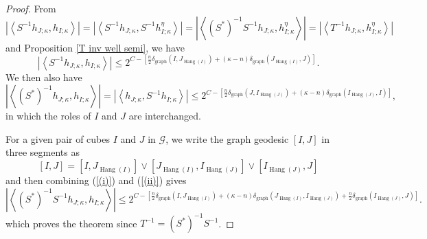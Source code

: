\documentclass{amsart}%
\theoremstyle{plain}
\numberwithin{equation}{section}
\begin{document}
\begin{proof}
From
\[
\left\vert \left\langle S^{-1}h_{J;\kappa},h_{I;\kappa}\right\rangle
\right\vert =\left\vert \left\langle S^{-1}h_{J;\kappa},S^{-1}h_{I;\kappa
}^{\eta}\right\rangle \right\vert =\left\vert \left\langle \left(  S^{\ast
}\right)  ^{-1}S^{-1}h_{J;\kappa},h_{I;\kappa}^{\eta}\right\rangle \right\vert
=\left\vert \left\langle T^{-1}h_{J;\kappa},h_{I;\kappa}^{\eta}\right\rangle
\right\vert
\]
and Proposition \ref{T inv well semi}, we have%
\begin{equation}
\left\vert \left\langle S^{-1}h_{J;\kappa},h_{I;\kappa}\right\rangle
\right\vert \leq2^{C-\left[  \frac{n}{2}\delta_{\operatorname*{graph}}\left(
I,J_{\operatorname*{Hang}\left(  I\right)  }\right)  +\left(  \kappa-n\right)
\delta_{\operatorname*{graph}}\left(  J_{\operatorname*{Hang}\left(  I\right)
},J\right)  \right]  }.\label{(i)}%
\end{equation}
We then also have%
\begin{equation}
\left\vert \left\langle \left(  S^{\ast}\right)  ^{-1}h_{J;\kappa}%
,h_{I;\kappa}\right\rangle \right\vert =\left\vert \left\langle h_{J;\kappa
},S^{-1}h_{I;\kappa}\right\rangle \right\vert \leq2^{C-\left[  \frac{n}%
{2}\delta_{\operatorname*{graph}}\left(  J,I_{\operatorname*{Hang}\left(
J\right)  }\right)  +\left(  \kappa-n\right)  \delta_{\operatorname*{graph}%
}\left(  I_{\operatorname*{Hang}\left(  J\right)  },I\right)  \right]
},\label{(ii)}%
\end{equation}
in which the roles of $I$ and $J$ are interchanged.

For a given pair of cubes $I$ and $J$ in $\mathcal{G}$, we write the graph
geodesic $\left[  I,J\right]  $ in three segments as
\[
\left[  I,J\right]  =\left[  I,J_{\operatorname*{Hang}\left(  I\right)
}\right]  \vee\left[  J_{\operatorname*{Hang}\left(  I\right)  }%
,I_{\operatorname*{Hang}\left(  J\right)  }\right]  \vee\left[
I_{\operatorname*{Hang}\left(  J\right)  },J\right]
\]
and then combining (\ref{(i)}) and (\ref{(ii)}) gives%
\[
\left\vert \left\langle \left(  S^{\ast}\right)  ^{-1}S^{-1}h_{J;\kappa
},h_{I;\kappa}\right\rangle \right\vert \leq2^{C-\left[  \frac{n}{2}%
\delta_{\operatorname*{graph}}\left(  I,J_{\operatorname*{Hang}\left(
I\right)  }\right)  +\left(  \kappa-n\right)  \delta_{\operatorname*{graph}%
}\left(  J_{\operatorname*{Hang}\left(  I\right)  },I_{\operatorname*{Hang}%
\left(  J\right)  }\right)  +\frac{n}{2}\delta_{\operatorname*{graph}}\left(
I_{\operatorname*{Hang}\left(  J\right)  },J\right)  \right]  }.
\]
which proves the theorem since $T^{-1}=\left(  S^{\ast}\right)  ^{-1}S^{-1}$.
\end{proof}
\end{document}
